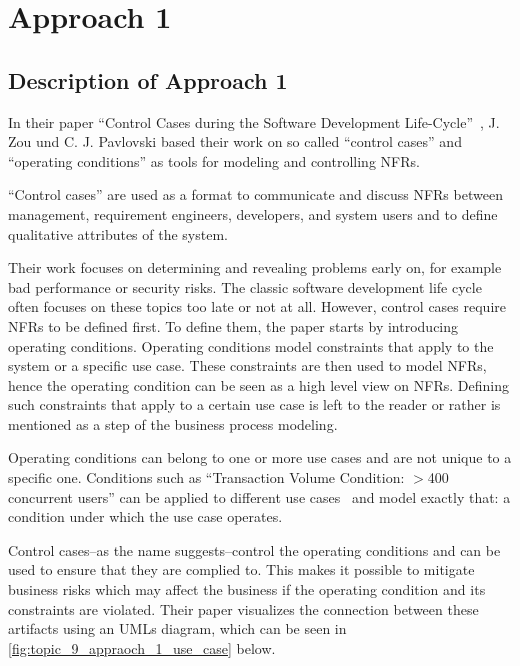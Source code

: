 \section{Approach 1} \label{sec:9_approach_1}


\subsection{Description of Approach 1}

In their paper \enquote{Control Cases during the Software Development Life-Cycle}~\cite{ZouPavlovski2008}, J. Zou und C. J. Pavlovski based their work on so called  \enquote{control cases} and \enquote{operating conditions} as tools for modeling and controlling \glspl{NFR}.

\enquote{Control cases} are used as a format to communicate and discuss \glspl{NFR} between management, requirement engineers, developers, and system users and to define qualitative attributes of the system.

Their work focuses on determining and revealing problems early on, for example bad performance or security risks.
The classic software development life cycle often focuses on these topics too late or not at all.
However, control cases require \glspl{NFR} to be defined first.
To define them, the paper starts by introducing operating conditions.
Operating conditions model constraints that apply to the system or a specific use case. These constraints are then used to model \glspl{NFR}, hence the operating condition can be seen as a high level view on \glspl{NFR}.
Defining such constraints that apply to a certain use case is left to the reader or rather is mentioned as a step of the business process modeling.

Operating conditions can belong to one or more use cases and are not unique to a specific one. Conditions such as \enquote{Transaction Volume Condition: $>$400 concurrent users} can be applied to different use cases~\cite{ZouPavlovski2008} and model exactly that: a condition under which the use case operates.

Control cases--as the name suggests--control the operating conditions and can be used to ensure that they are complied to.
This makes it possible to mitigate business risks which may affect the business if the operating condition and its constraints are violated.
Their paper visualizes the connection between these artifacts using an \glspl{UML} diagram, which can be seen in \autoref{fig:topic_9_appraoch_1_use_case} below.

